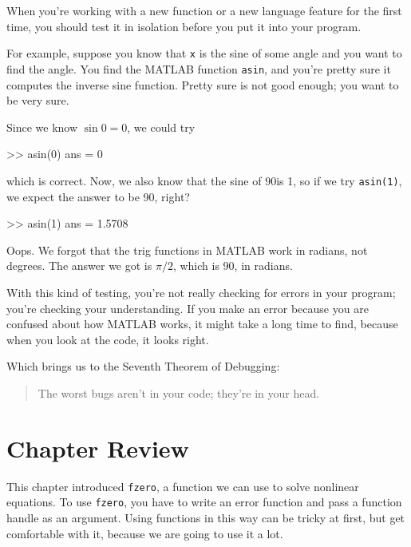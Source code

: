 \documentclass[../../book.tex]{subfiles}
\begin{document}
When you're working with a new function or a new language feature
for the first time, you should test it in isolation before you
put it into your program.


For example, suppose you know that \lstinline{x} is the sine of some
angle and you want to find the angle.  You find the MATLAB function
\lstinline{asin}, and you're pretty sure it computes the inverse sine
function.  Pretty sure is not good enough; you want to be very sure.

Since we know $\sin 0 = 0$, we could try

\begin{code}
>> asin(0)
ans = 0
\end{code}
which is correct.  Now, we also know that the sine of $90$\textdegree is
1, so if we try \lstinline{asin(1)}, we expect the answer to be 90, right?

\begin{code}
>> asin(1)
ans = 1.5708
\end{code}

Oops.  We forgot that the trig functions in MATLAB work in radians,
not degrees.  The answer we got is $\pi/2$, which is $90$\textdegree, in radians.

With this kind of testing, you're not really checking for
errors in your program; you're checking your understanding.  If you
make an error because you are confused about how MATLAB works, it
might take a long time to find, because when you look at the code,
it looks right.


Which brings us to the Seventh Theorem of Debugging:

\begin{quote}
The worst bugs aren't in your code; they're in your head.
\end{quote}

\section{Chapter Review}

This chapter introduced \lstinline{fzero}, a function we can use to solve nonlinear equations.
To use \lstinline{fzero}, you have to write an error function and pass a function handle as an argument.  Using functions in this way can be tricky at first, but get comfortable with it, because we are going to use it a lot.
\end{document}
